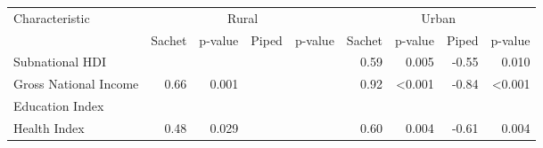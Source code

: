 \begin{tabular}{l r r r r r r r r}
\toprule
Characteristic & \multicolumn{4}{c}{Rural} & \multicolumn{4}{c}{Urban} \\
\cmidrule(lr){2-5}
\cmidrule(lr){6-9}
& Sachet & p-value & Piped & p-value & Sachet & p-value & Piped & p-value \\
\midrule
Subnational HDI  &    &    &    &    &  0.59  &  0.005  &  -0.55  &  0.010  \\
Gross National Income  &  0.66  &  0.001  &    &    &  0.92  &  \textless{}0.001  &  -0.84  &  \textless{}0.001  \\
Education Index  &    &    &    &    &    &    &    &    \\
Health Index  &  0.48  &  0.029  &    &    &  0.60  &  0.004  &  -0.61  &  0.004  \\
\bottomrule
\end{tabular}
